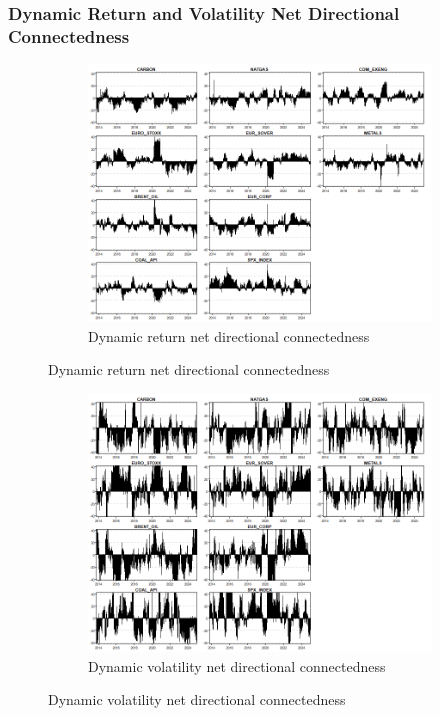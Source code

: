 \documentclass[preprint, 3p,
authoryear]{elsarticle} %
\begin{document}
\begin{landscape}
\subsubsection{Dynamic Return and Volatility Net Directional Connectedness}

\begin{figure}[H]
  \caption{Dynamic Net Directional Connectedness (Jan 2013 – Jan 2025)}
    \centering
      \begin{subfigure}[a]{\textwidth}
        \caption{Dynamic return net directional connectedness}
        \includegraphics[width = 1.25\linewidth]{14aApdxD-8-180-RetNDC}
      \end{subfigure}
\end{figure}
\begin{figure}[H]
  \ContinuedFloat
  \centering
      \begin{subfigure}[b]{\textwidth}
        \caption{Dynamic volatility net directional connectedness}
        \includegraphics[width = 1.25\linewidth]{14bApdxD-8-180-VolNDC}
      \end{subfigure}
\end{figure}




\end{landscape}
\end{document}
